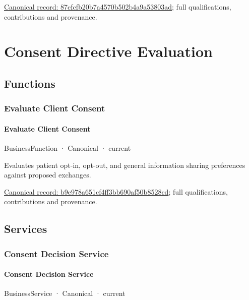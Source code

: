 {\footnotesize \href{../../../../continuum/business/business-service/87cfcfb20b7a4570b502b4a9a53803ad.md}{Canonical record: 87cfcfb20b7a4570b502b4a9a53803ad}; full qualifications, contributions and provenance.}\par
\section{Consent Directive Evaluation}

\subsection{Functions}

\subsubsection{Evaluate Client Consent}

\paragraph{Evaluate Client Consent}

\label{element:b9e978a651cf4ff3bb690af50b8528cd}
{\small BusinessFunction · Canonical · current}\par

Evaluates patient opt-in, opt-out, and general information sharing preferences against proposed exchanges.


{\footnotesize \href{../../../../continuum/business/business-function/b9e978a651cf4ff3bb690af50b8528cd.md}{Canonical record: b9e978a651cf4ff3bb690af50b8528cd}; full qualifications, contributions and provenance.}\par
\subsection{Services}

\subsubsection{Consent Decision Service}

\paragraph{Consent Decision Service}

\label{element:e1bebefbdbef4a1981ec31341eb71dfd}
{\small BusinessService · Canonical · current}\par


